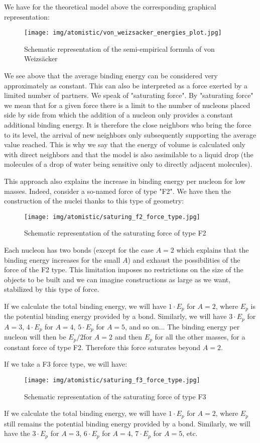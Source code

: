 	We have for the theoretical model above the corresponding graphical representation:
	\begin{figure}[H]
		\centering
		\texttt{[image: img/atomistic/von\_weizsacker\_energies\_plot.jpg]}
		\caption{Schematic representation of the semi-empirical formula of von Weizsäcker}
	\end{figure}
	We see above that the average binding energy can be considered very approximately as constant. This can also be interpreted as a force exerted by a limited number of partners. We speak of "saturating force". By "saturating force" we mean that for a given force there is a limit to the number of nucleons placed side by side from which the addition of a nucleon only provides a constant additional binding energy. It is therefore the close neighbors who bring the force to its level, the arrival of new neighbors only subsequently supporting the average value reached. This is why we say that the energy of volume is calculated only with direct neighbors and that the model is also assimilable to a liquid drop (the molecules of a drop of water being sensitive only to directly adjacent molecules).

	This approach also explains the increase in binding energy per nucleon for low masses. Indeed, consider a so-named force of type "F2". We have then the construction of the nuclei thanks to this type of geometry:
	\begin{figure}[H]
		\centering
		\texttt{[image: img/atomistic/saturing\_f2\_force\_type.jpg]}
		\caption[]{Schematic representation of the saturating force of type F2}
	\end{figure}
	Each nucleon has two bonds (except for the case $A = 2$ which explains that the binding energy increases for the small $A$) and exhaust the possibilities of the force of the F2 type. This limitation imposes no restrictions on the size of the objects to be built and we can imagine constructions as large as we want, stabilized by this type of force.
	
	If we calculate the total binding energy, we will have $1\cdot E_p$ for $A = 2$, where $E_p$ is the potential binding energy provided by a bond. Similarly, we will have $3\cdot E_p$ for $A = 3$, $4\cdot E_p$ for $A = 4$, $5\cdot E_p$ for $A = 5$, and so on... The binding energy per nucleon will then be $E_p/2 $for $A = 2$ and then $E_p$ for all the other masses, for a constant force of type F2. Therefore this force saturates beyond $A = 2$.

	If we take a F3 force type, we will have:
	\begin{figure}[H]
		\centering
		\texttt{[image: img/atomistic/saturing\_f3\_force\_type.jpg]}
		\caption[]{Schematic representation of the saturating force of type F3}
	\end{figure}
	If we calculate the total binding energy, we will have $1\cdot E_p$ for $A = 2$, where $E_p$ still remains the potential binding energy provided by a bond. Similarly, we will have the $3\cdot E_p$ for $A = 3$, $6\cdot E_p$ for $A = 4$, $7\cdot E_p$ for $A = 5$, etc.
	
